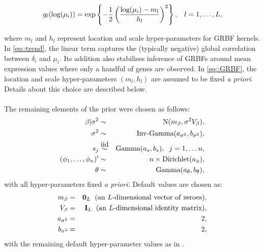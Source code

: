 \begin{equation} \label{eq::GRBF}
g_l(\log(\mu_i)) = \exp\left\lbrace-\frac{1}{2}\left(\dfrac{\log(\mu_i)-m_l}{h_l}\right)^2\right\rbrace, \hspace{0.3cm} l = 1, \ldots, L,
\end{equation} 

where $m_l$ and $h_l$ represent location and scale hyper-parameters for GRBF kernels. \\

In \eqref{eq::trend}, the linear term captures the (typically negative) global correlation between $\delta_i$ and $\mu_i$. Its addition also stabilises inference of GRBFs around mean expression values where only a handful of genes are observed. In \eqref{eq::GRBF}, the location and scale hyper-parameters $(m_l, h_l)$ are assumed to be fixed \emph{a priori}.  Details about this choice are described below.\\

 \\

The remaining elements of the prior were chosen as follows: \begin{eqnarray}
\beta|\sigma^2 & \sim &\textnormal{N}(m_\beta,\sigma^2V_\beta),\\
\sigma^2 & \sim & \textnormal{Inv-Gamma}(a_{\sigma^2},b_{\sigma^2}),\\
s_j & \stackrel{\mbox{iid}}{\sim} & \textnormal{Gamma}(a_s,b_s), \hspace{0.2cm} j = 1, \ldots n,\\
(\phi_1, \ldots, \phi_n)' & \sim & n \times \textnormal{Dirichlet}(a_\phi),\\
\theta & \sim & \textnormal{Gamma}(a_\theta,b_\theta),
\end{eqnarray} with all hyper-parameters fixed \emph{a priori}. Default values are chosen as: \begin{eqnarray}
m_{\beta} & = & \mathbf{0}_L \hspace{0.2cm} \text{(an $L$-dimensional vector of zeroes)},\\
V_{\beta} & = & \mathbf{I}_L \hspace{0.2cm} \text{(an $L$-dimensional identity matrix)},\\
a_{\sigma^2} & = & 2,\\
b_{\sigma^2} & = & 2,
\end{eqnarray} with the remaining default hyper-parameter values as in \cite{Vallejos2016a}.\\

